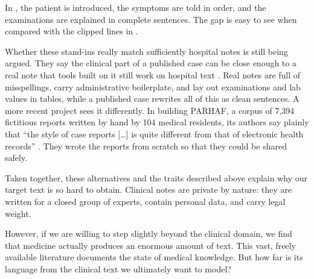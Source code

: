 \begin{reviewread}
In , the patient is introduced, the symptoms are told in order, and the examinations are explained in complete sentences.
The gap is easy to see when compared with the clipped lines in .
\end{reviewread}

\begin{reviewread}
Whether these stand-ins really match sufficiently hospital notes is still being argued.
They say the clinical part of a published case can be close enough to a real note that tools built on it still work on hospital text \citep{grabar_cas_2020}.
Real notes are full of misspellings, carry administrative boilerplate, and lay out examinations and lab values in tables, while a published case rewrites all of this as clean sentences.
A more recent project sees it differently.
In building PARHAF, a corpus of 7{,}394 fictitious reports written by hand by 104 medical residents, its authors say plainly that ``the style of case reports [\ldots] is quite different from that of electronic health records'' \citep{tannier_parhaf_2026}.
They wrote the reports from scratch so that they could be shared safely.
\end{reviewread}

\begin{reviewread}
Taken together, these alternatives and the traits described above explain why our target text is so hard to obtain.
Clinical notes are private by nature: they are written for a closed group of experts, contain personal data, and carry legal weight.
\end{reviewread}

\begin{reviewread}
However, if we are willing to step slightly beyond the clinical domain, we find that medicine actually produces an enormous amount of text.
This vast, freely available literature documents the state of medical knowledge.
But how far is its language from the clinical text we ultimately want to model? 
\end{reviewread}
